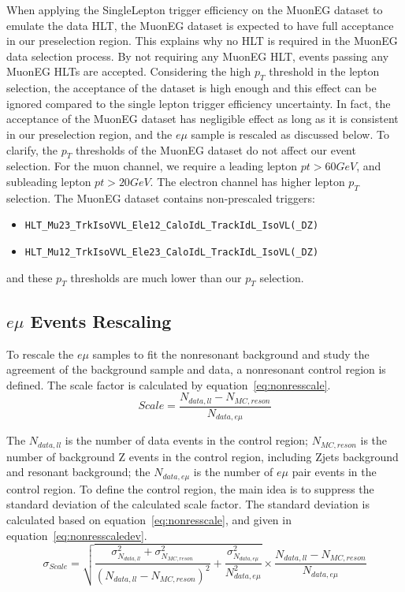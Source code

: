 \vspace{0.3cm}
When applying the SingleLepton trigger efficiency on the MuonEG dataset to emulate the data HLT, the MuonEG dataset is expected to have full acceptance in our preselection region. This explains why no HLT is required in the MuonEG data selection process. By not requiring any MuonEG HLT, events passing any MuonEG HLTs are accepted. Considering the high $p_T$ threshold in the lepton selection, the acceptance of the dataset is high enough and this effect can be ignored compared to the single lepton trigger efficiency uncertainty. In fact, the acceptance of the MuonEG dataset has negligible effect as long as it is consistent in our preselection region, and the $e\mu$ sample is rescaled as discussed below. To clarify, the $p_T$ thresholds of the MuonEG dataset do not affect our event selection. For the muon channel, we require a leading lepton $pt>60 GeV$, and subleading lepton $pt>20 GeV$. The electron channel has higher lepton $p_T$ selection. The MuonEG dataset contains non-prescaled triggers:
\begin{itemize}
\item \texttt{HLT\_Mu23\_TrkIsoVVL\_Ele12\_CaloIdL\_TrackIdL\_IsoVL(\_DZ)} 
\item \texttt{HLT\_Mu12\_TrkIsoVVL\_Ele23\_CaloIdL\_TrackIdL\_IsoVL(\_DZ)}
\end{itemize}
and these $p_T$ thresholds are much lower than our $p_T$ selection.

\subsection{$e\mu$ Events Rescaling}
To rescale the $e\mu$ samples to fit the nonresonant background and study the agreement of the background sample and data, a nonresonant control region is defined. The scale factor is calculated by equation~\ref{eq:nonresscale}.
\begin{equation} \label{eq:nonresscale}
  Scale  =  \frac{N_{data,ll}-N_{MC,reson}}{N_{data,e\mu}}
\end{equation}

The $N_{data,ll}$ is the number of data events in the control region; $N_{MC,reson}$ is the number of background Z events in the control region, including Zjets background and resonant background; the $N_{data,e\mu}$ is the number of $e\mu$ pair events in the control region. To define the control region, the main idea is to suppress the standard deviation of the calculated scale factor. The standard deviation is calculated based on equation~\ref{eq:nonresscale}, and given in equation~\ref{eq:nonresscaledev}.
\begin{equation} \label{eq:nonresscaledev}
  \sigma_{Scale}  = \sqrt{\frac{\sigma^{2}_{N_{data,ll}}+\sigma^{2}_{N_{MC,reson}}}{(N_{data,ll}-N_{MC,reson})^{2}}+\frac{\sigma^{2}_{N_{data,e\mu}}}{N^{2}_{data,e\mu}}}\times \frac{N_{data,ll}-N_{MC,reson}}{N_{data,e\mu}}
\end{equation}

